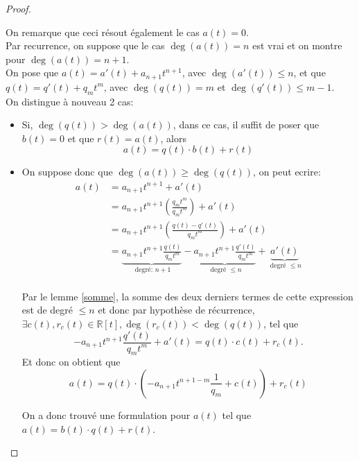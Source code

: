 \documentclass[11pt, a4paper, twoside]{article}
\begin{document}
\begin{proof}
\begin{itemize}
\end{itemize}
On remarque que ceci résout également le cas $ a(t)=0$.\\
Par recurrence, on suppose que le cas $\deg(a(t))=n$ est vrai et on montre pour $\deg(a(t))=n+1$.\\
On pose que $a(t)=a'(t) + a_{n+1} t^{n+1}$, avec $\deg(a'(t))\leq n$, et que $q(t) = q'(t) + q_m t^{m}$, avec $\deg(q(t)) = m$ et $\deg(q'(t))\leq m-1$.\\
On distingue à nouveau 2 cas:
\begin{itemize}
	\item Si, $\deg(q(t)) > \deg(a(t))$, dans ce cas, il suffit de poser que $b(t) = 0$ et que $r(t)= a(t)$, alors
		\[ 
			a(t) = q(t) \cdot b(t) + r(t)
		\]
	\item On suppose donc que $\deg(a(t)) \geq \deg(q(t))$, on peut ecrire:
		\begin{align*}
			a(t) &= a_{n+1} t^{n+1} + a'(t)\\
			     &= a_{n+1} t^{n+1} \left( \frac{q_m t^{m}}{q_{m} t^{m}}\right) + a'(t)\\
			     &= a_{n+1} t^{n+1} \left( \frac{q(t) - q'(t)}{q_{m} t^{m}}\right) + a'(t)\\
			     &= \underbrace{a_{n+1} t^{n+1} \frac{q(t)}{q_m t^{m}}}_{ \text{ degré: } n+1}
			     - \underbrace{a_{n+1} t^{n+1} \frac{q'(t)}{q_m t^{m}}}_{ \text{ degré  } \leq n } + \underbrace{a'(t)}_{ \text{ degré } \leq n}\\
		\end{align*}

		Par le lemme \ref{somme}, la somme des deux derniers termes de cette expression est de degré $\leq n$ et donc par hypothèse de récurrence, $\exists c(t), r_c(t) \in \mathbb{R}[t], \deg(r_c(t)) < \deg(q(t))$, tel que
\[ 
	- a_{n+1} t^{n+1} \frac{q'(t)}{q_m t^{m}} + a'(t) = q(t) \cdot c(t) + r_c(t)
.\]
Et donc on obtient que
\[ 
	a(t) = q(t) \cdot \left( - a_{n+1} t^{n+1-m} \frac{1}{q_m } + c(t) \right) + r_c(t)
\]


		

On a donc trouvé une formulation pour $a(t)$ tel que $a(t)=b(t) \cdot q(t) + r(t)$.
\end{itemize}
\end{proof}
\end{document}

